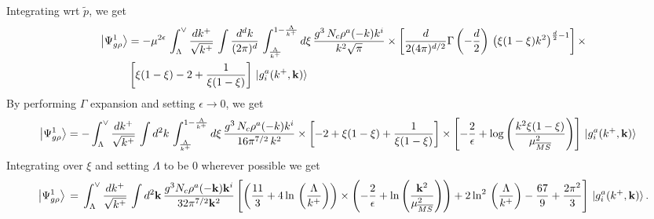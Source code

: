 \documentclass[aps,prd,amsmath,amssymb,nofootinbib]{revtex4-2}
\numberwithin{equation}{section}
\begin{document}
Integrating wrt $\tilde{p}$, we get
\begin{align}
    \left|\Psi_{g\rho}^{1}\right\rangle & = -\mu^{2\epsilon}\, \int_{\Lambda}^{\vee} \frac{dk^{+}}{\sqrt{k^{+}}} \, \int \frac{d^{d}k}{(2\pi)^{d}}\, \int_{\frac{\Lambda}{k^{+}}}^{1-\frac{\Lambda}{k^{+}}} d\xi\, \frac{g^{3}\,N_{c}\rho^{a}(-k) k^{i}}{k^{2}\sqrt{\pi}}\times \left[\frac{d}{2(4\pi)^{d/2}}\Gamma\left(-\frac{d}{2}\right)\,\left(\xi(1-\xi)k^{2}\right)^{\frac{d}{2}-1}\right]\times\notag \\ &  \left[\xi(1-\xi)-2+\frac{1}{\xi(1-\xi)}\right]\,\ket{g^{a}_{i}(k^{+},\mathbf{k})}
\end{align}
By performing $\Gamma$ expansion and setting $\epsilon \rightarrow 0$, we get
\begin{align}
     \left|\Psi_{g\rho}^{1}\right\rangle & = - \int_{\Lambda}^{\vee} \frac{dk^{+}}{\sqrt{k^{+}}} \,\int d^{2}k\, \int_{\frac{\Lambda}{k^{+}}}^{1-\frac{\Lambda}{k^{+}}} d\xi\, \frac{g^{3}\,N_{c}\rho^{a}(-k) k^{i}}{16\pi^{7/2}\,k^{2}}\times \left[-2+\xi(1-\xi)+\frac{1}{\xi(1-\xi)}\right]\times \left[-\frac{2}{\epsilon}+\log{\left(\frac{k^{2}\xi(1-\xi)}{\mu^{2}_{\overline{MS}}}\right)}\right]\, \ket{g^{a}_{i}(k^{+},\mathbf{k})}
\end{align}
Integrating over $\xi$ and setting $\Lambda$ to be $0$ wherever possible we get\\
\begin{align}\label{gtwoloop1}
\left|\Psi_{g\rho}^{1}\right\rangle\,=\,\int_{\Lambda}^{\vee}\frac{dk^{+}}{\sqrt{k^{+}}}\,\int d^{2}\mathbf{k}\,\frac{g^{3}N_{c}\rho^{a}(-\mathbf{k})\mathbf{k}^{i}}{32\pi^{7/2}\mathbf{k}^{2}}
\left[\left(\frac{11}{3}+4\ln\,\left(\frac{\Lambda}{k^{+}}\right)\right)\times\left(-\frac{2}{\epsilon}+\ln\left(\frac{\mathbf{k}^{2}}{\mu_{\overline{MS}}^{2}}\right)\right)+2\ln^{2}\,\left(\frac{\Lambda}{k^{+}}\right)-\frac{67}{9}+\frac{2\pi^{2}}{3}\right]\, \ket{g^{a}_{i}(k^{+},\mathbf{k})}.
\end{align}
\end{document}
